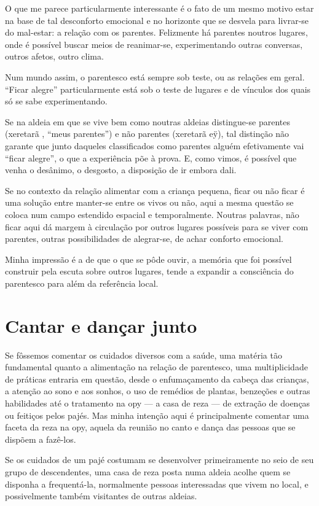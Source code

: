 O que me parece particularmente interessante é o fato de um mesmo motivo
estar na base de tal desconforto emocional e no horizonte que se
desvela para livrar-se do mal-estar: a relação com os parentes.
Felizmente há parentes noutros lugares, onde é possível buscar meios de
reanimar-se, experimentando outras conversas, outros afetos, outro
clima. 

Num mundo assim, o parentesco está sempre sob teste, ou as relações em
geral. ``Ficar alegre'' particularmente está sob o teste de lugares e de
vínculos dos quais só se sabe experimentando. 

Se na aldeia em que se vive bem como noutras aldeias distingue-se
parentes (xeretarã , ``meus parentes'') e não parentes (xeretarã eÿ), tal
distinção não garante que junto daqueles classificados como parentes
alguém efetivamente vai ``ficar alegre'', o que a experiência põe à
prova. E, como vimos, é possível que venha o desânimo, o desgosto, a
disposição de ir embora dali.

Se no contexto da relação alimentar com a criança pequena, ficar ou não
ficar é uma solução entre manter-se entre os vivos ou não, aqui a mesma
questão se coloca num campo estendido espacial e temporalmente. Noutras
palavras, não ficar aqui dá margem à circulação por outros lugares
possíveis para se viver com parentes, outras possibilidades de
alegrar-se, de achar conforto emocional. 

Minha impressão é a de que o que se pôde ouvir, a memória que foi
possível construir pela escuta sobre outros lugares, tende a expandir a
consciência do parentesco para além da referência local. 

\section{Cantar e dançar junto}

Se fôssemos comentar os cuidados diversos com a saúde, uma matéria tão
fundamental quanto a alimentação na relação de parentesco, uma
multiplicidade de práticas entraria em questão, desde o enfumaçamento
da cabeça das crianças, a atenção ao sono e aos sonhos, o uso de
remédios de plantas, benzeções e outras habilidades até o tratamento na
opy — a casa de reza — de extração de doenças ou feitiços pelos pajés.
Mas minha intenção aqui é principalmente comentar uma faceta da reza na
opy, aquela da reunião no canto e dança das pessoas que se dispõem a
fazê-los.

Se os cuidados de um pajé costumam se desenvolver primeiramente no seio
de seu grupo de descendentes, uma casa de reza posta numa aldeia acolhe
quem se disponha a frequentá-la, normalmente pessoas interessadas que
vivem no local, e possivelmente também visitantes de outras aldeias.

